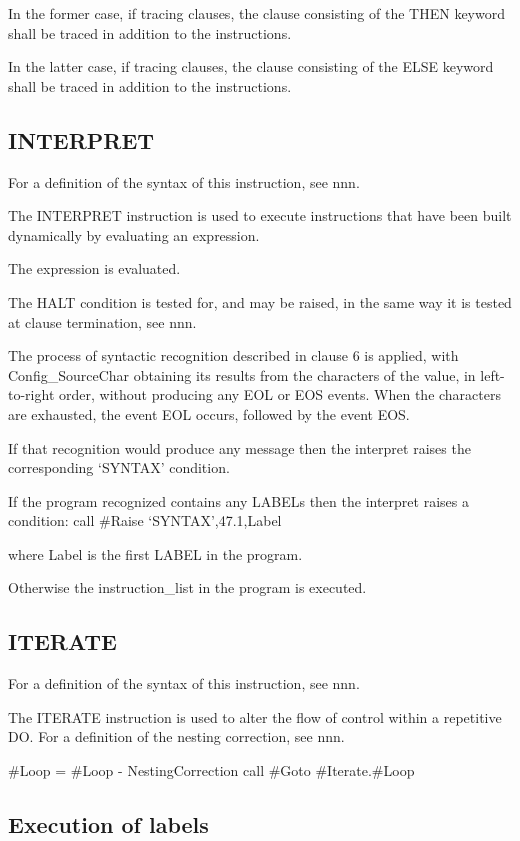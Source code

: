 In the former case, if tracing clauses, the clause consisting of the
THEN keyword shall be traced in addition to the instructions.

In the latter case, if tracing clauses, the clause consisting of the
ELSE keyword shall be traced in addition to the instructions.

\subsection{INTERPRET}\label{interpret}

For a definition of the syntax of this instruction, see nnn.

The INTERPRET instruction is used to execute instructions that have been
built dynamically by evaluating an expression.

The expression is evaluated.

The HALT condition is tested for, and may be raised, in the same way it
is tested at clause termination, see nnn.

The process of syntactic recognition described in clause 6 is applied,
with Config\_SourceChar obtaining its results from the characters of the
value, in left-to-right order, without producing any EOL or EOS events.
When the characters are exhausted, the event EOL occurs, followed by the
event EOS.

If that recognition would produce any message then the interpret raises
the corresponding `SYNTAX' condition.

If the program recognized contains any LABELs then the interpret raises
a condition: call \#Raise `SYNTAX',47.1,Label

where Label is the first LABEL in the program.

Otherwise the instruction\_list in the program is executed.

\subsection{ITERATE}\label{iterate}

For a definition of the syntax of this instruction, see nnn.

The ITERATE instruction is used to alter the flow of control within a
repetitive DO. For a definition of the nesting correction, see nnn.

\#Loop = \#Loop - NestingCorrection call \#Goto \#Iterate.\#Loop

\subsection{Execution of labels}\label{execution-of-labels}

